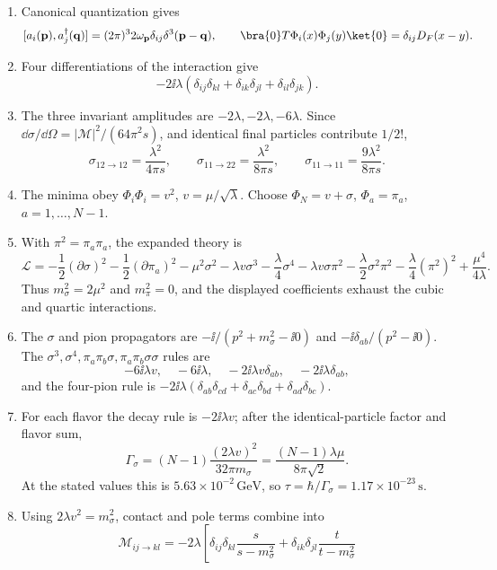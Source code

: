 \begin{enumerate}
\begin{enumerate}
\item
Canonical quantization gives
\[
 [a_i(\mathbf p),a_j^\dagger(\mathbf q)]
 =(2\pi)^3 2\omega_{\mathbf p}\delta_{ij}\delta^3(\mathbf p-\mathbf q),
\qquad
 \bra{0}T\Phi_i(x)\Phi_j(y)\ket{0}=\delta_{ij}D_F(x-y).
\]
\item
Four differentiations of the interaction give
\[
 -2\ii\lambda(\delta_{ij}\delta_{kl}+\delta_{ik}\delta_{jl}
 +\delta_{il}\delta_{jk}).
\]
\item
The three invariant amplitudes are \(-2\lambda,-2\lambda,-6\lambda\).
Since \(\dd\sigma/\dd\Omega=|\mathcal M|^2/(64\pi^2s)\), and identical
final particles contribute \(1/2!\),
\[
 \sigma_{12\to12}=\frac{\lambda^2}{4\pi s},\qquad
 \sigma_{11\to22}=\frac{\lambda^2}{8\pi s},\qquad
 \sigma_{11\to11}=\frac{9\lambda^2}{8\pi s}.
\]
\item
The minima obey \(\Phi_i\Phi_i=v^2\), \(v=\mu/\sqrt\lambda\).
Choose \(\Phi_N=v+\sigma\), \(\Phi_a=\pi_a\),
\(a=1,\ldots,N-1\).
\item
With \(\pi^2=\pi_a\pi_a\), the expanded theory is
\[
 \mathcal L=-\frac12(\partial\sigma)^2-\frac12(\partial\pi_a)^2
 -\mu^2\sigma^2-\lambda v\sigma^3-\frac{\lambda}{4}\sigma^4
 -\lambda v\sigma\pi^2-\frac{\lambda}{2}\sigma^2\pi^2
 -\frac{\lambda}{4}(\pi^2)^2+\frac{\mu^4}{4\lambda}.
\]
Thus \(m_\sigma^2=2\mu^2\) and \(m_\pi^2=0\), and the displayed
coefficients exhaust the cubic and quartic interactions.
\item
The \(\sigma\) and pion propagators are
\(-\ii/(p^2+m_\sigma^2-\ii0)\) and
\(-\ii\delta_{ab}/(p^2-\ii0)\).  The
\(\sigma^3,\sigma^4,\pi_a\pi_b\sigma,\pi_a\pi_b\sigma\sigma\) rules are
\[
 -6\ii\lambda v,\quad-6\ii\lambda,\quad
 -2\ii\lambda v\delta_{ab},\quad-2\ii\lambda\delta_{ab},
\]
and the four-pion rule is
\(-2\ii\lambda(\delta_{ab}\delta_{cd}+\delta_{ac}\delta_{bd}
+\delta_{ad}\delta_{bc})\).
\item
For each flavor the decay rule is \(-2\ii\lambda v\); after the
identical-particle factor and flavor sum,
\[
 \Gamma_\sigma=(N-1)\frac{(2\lambda v)^2}{32\pi m_\sigma}
 =\frac{(N-1)\lambda\mu}{8\pi\sqrt2}.
\]
At the stated values this is \(5.63\times10^{-2}\,\mathrm{GeV}\), so
\(\tau=\hbar/\Gamma_\sigma=1.17\times10^{-23}\,\mathrm{s}\).
\item
Using \(2\lambda v^2=m_\sigma^2\), contact and pole terms combine into
\[
 \mathcal M_{ij\to kl}=-2\lambda\left[
 \delta_{ij}\delta_{kl}\frac{s}{s-m_\sigma^2}
 +\delta_{ik}\delta_{jl}\frac{t}{t-m_\sigma^2}
\]
\end{enumerate}
\end{enumerate}
